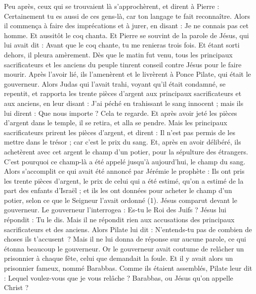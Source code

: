 \begin{multicols}{2}
{Peu après, ceux qui se trouvaient là s'approchèrent, et dirent à Pierre : Certainement tu es aussi de ces gens-là, car ton langage te fait reconnaître.
Alors il commença à faire des imprécations et à jurer, en disant : Je ne connais pas cet homme. Et aussitôt le coq chanta.
Et Pierre se souvint de la parole de Jésus, qui lui avait dit : Avant que le coq chante, tu me renieras trois fois. Et étant sorti dehors, il pleura amèrement.
\VerseOne{}Dès que le matin fut venu, tous les principaux sacrificateurs et les anciens du peuple tinrent conseil contre Jésus pour le faire mourir.
Après l’avoir lié, ils l'amenèrent et le livrèrent à Ponce Pilate, qui était le gouverneur.
Alors Judas qui l'avait trahi, voyant qu'il était condamné, se repentit, et rapporta les trente pièces d'argent aux principaux sacrificateurs et aux anciens,
en leur disant : J’ai péché en trahissant le sang innocent ; mais ils lui dirent : Que nous importe ? Cela te regarde.
Et après avoir jeté les pièces d'argent dans le temple, il se retira, et alla se pendre.
Mais les principaux sacrificateurs prirent les pièces d'argent, et dirent : Il n'est pas permis de les mettre dans le trésor ; car c’est le prix du sang.
Et, après en avoir délibéré, ils achetèrent avec cet argent le champ d'un potier, pour la sépulture des étrangers.
C'est pourquoi ce champ-là a été appelé jusqu'à aujourd'hui, le champ du sang.
Alors s’accomplit ce qui avait été annoncé par Jérémie le prophète : Ils ont pris les trente pièces d'argent, le prix de celui qui a été estimé, qu’on a estimé de la part des enfants d'Israël ;
et ils les ont données pour acheter le champ d'un potier, selon ce que le Seigneur l’avait ordonné (1).
Jésus comparut devant le gouverneur. Le gouverneur l'interrogea : Es-tu le Roi des Juifs ? Jésus lui répondit : Tu le dis.
Mais il ne répondit rien aux accusations des principaux sacrificateurs et des anciens.
Alors Pilate lui dit : N'entends-tu pas de combien de choses ils t’accusent ?
Mais il ne lui donna de réponse sur aucune parole, ce qui étonna beaucoup le gouverneur.
Or le gouverneur avait coutume de relâcher un prisonnier à chaque fête, celui que demandait la foule.
Et il y avait alors un prisonnier fameux, nommé Barabbas.
Comme ils étaient assemblés, Pilate leur dit : Lequel voulez-vous que je vous relâche ? Barabbas, ou Jésus qu'on appelle Christ ?
}
\end{multicols}
